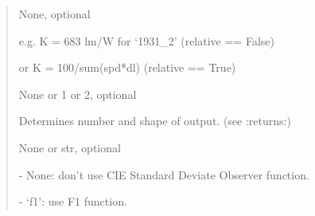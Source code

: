 \documentclass[letterpaper,10pt,english]{sphinxmanual}
\begin{document}
\begin{fulllineitems}
\begin{description}
\begin{quote}
\begin{description}
\item[{K}] \leavevmode
\begin{DUlineblock}{0em}
\item[] None, optional
\item[]
\begin{DUlineblock}{\DUlineblockindent}
\item[] e.g.  K  = 683 lm/W for ‘1931\_2’ (relative == False) 
\item[] or K = 100/sum(spd*dl)        (relative == True)
\end{DUlineblock}
\end{DUlineblock}

\item[{out}] \leavevmode
\begin{DUlineblock}{0em}
\item[] None or 1 or 2, optional
\item[] Determines number and shape of output. (see :returns:)
\end{DUlineblock}

\item[{cie\_std\_dev\_obs}] \leavevmode
\begin{DUlineblock}{0em}
\item[] None or str, optional
\item[] - None: don’t use CIE Standard Deviate Observer function.
\item[] - ‘f1’: use F1 function.
\end{DUlineblock}

\end{description}\end{quote}


\end{description}
\end{fulllineitems}
\end{document}

